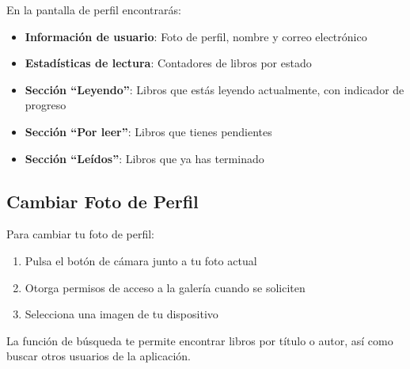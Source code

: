 \documentclass[a4paper,10pt]{report}
\begin{document}
    En la pantalla de perfil encontrarás:
    \begin{itemize}
      \item \textbf{Información de usuario}: Foto de perfil, nombre y correo electrónico
      \item \textbf{Estadísticas de lectura}: Contadores de libros por estado
      \item \textbf{Sección ``Leyendo''}: Libros que estás leyendo actualmente, con indicador de progreso
      \item \textbf{Sección ``Por leer''}: Libros que tienes pendientes
      \item \textbf{Sección ``Leídos''}: Libros que ya has terminado
    \end{itemize}
    
    \subsection{Cambiar Foto de Perfil}
    
    Para cambiar tu foto de perfil:
    \begin{enumerate}
      \item Pulsa el botón de cámara junto a tu foto actual
      \item Otorga permisos de acceso a la galería cuando se soliciten
      \item Selecciona una imagen de tu dispositivo
    \end{enumerate}    
    
    La función de búsqueda te permite encontrar libros por título o autor, así como buscar otros usuarios de la aplicación.
    
\end{document}

